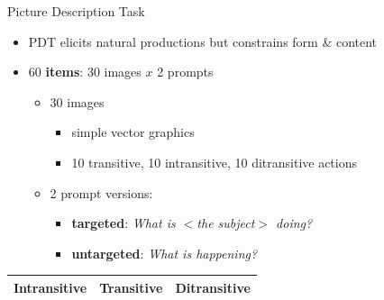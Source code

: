 \documentclass[final,t]{beamer}
\begin{document}
\begin{frame}{}
\begin{columns}[t]
\begin{column}{.33\linewidth}
\begin{block}{Picture Description Task}
\begin{center}
\begin{minipage}{.85\textwidth}
	\vspace{-.38em}
    \begin{itemize}
    \item{PDT elicits natural productions but constrains form \& content}
    \item{60 \textbf{items}: 30 images $x$ 2 prompts}
    \begin{itemize}
    \item 30 images
    \begin{itemize}
    	\item simple vector graphics
		\item 10 transitive, 10 intransitive, 10 ditransitive actions
	\end{itemize}
    \item 2 prompt versions:
    	\begin{itemize}
			\item \textbf{targeted}: \textit{What is $<$the subject$>$ doing?}
			\item \textbf{untargeted}: \textit{What is happening?}
		\end{itemize}
	\end{itemize}
    \end{itemize}
	\bigskip
\setlength{\fboxsep}{3pt}
\setlength{\fboxrule}{0pt}
\begin{table}[htb!]
\begin{center}
\begin{tabular}{|c|c|c|}
\hline
Intransitive & Transitive & Ditransitive \\
\hline

\end{tabular}
\end{center}
\end{table}
\end{minipage}
\end{center}
\end{block}
\end{column}
\end{columns}
\end{frame}
\end{document}
